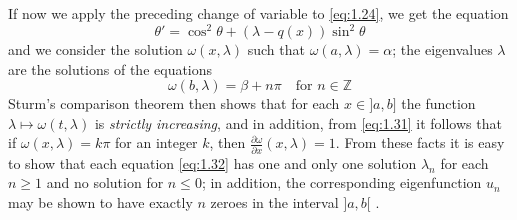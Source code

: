 \documentclass[12pt,a4paper,leqno,twoside]{extbook}
\newcommand{\pder}[2]{\frac{\partial #1}{\partial #2}}
\begin{document}
If now we apply the preceding change of variable to \eqref{eq:1.24}, we get the equation
\begin{equation}
    \label{eq:1.31}
    \theta' = \cos^2\theta + (\lambda - q(x))\sin^2\theta
\end{equation}
and we consider the solution \(\omega(x,\lambda)\) such that \(\omega(a,\lambda) = \alpha\); the eigenvalues \(\lambda\) are the solutions of the equations
\begin{equation}
    \label{eq:1.32}
    \omega(b, \lambda) = \beta + n\pi \quad \text{for \(n \in \mathbb{Z}\)}
\end{equation}
Sturm's comparison theorem then shows that for each \(x \in ]a,b]\) the function \(\lambda \mapsto \omega(t, \lambda)\) is \emph{strictly increasing}, and in addition, from \eqref{eq:1.31} it follows that if \(\omega(x,\lambda) = k\pi\) for an integer \(k\), then \(\pder{\omega}{x}(x, \lambda) = 1\). From these facts it is easy to show that each equation \eqref{eq:1.32} has one and only one solution \(\lambda_n\) for each \(n \geq 1\) and no solution for \(n \leq 0\); in addition, the corresponding eigenfunction \(u_n\) may be shown to have exactly \(n\) zeroes in the interval \(]a,b[\) \cite[p.~435--441]{052}.
\end{document}
